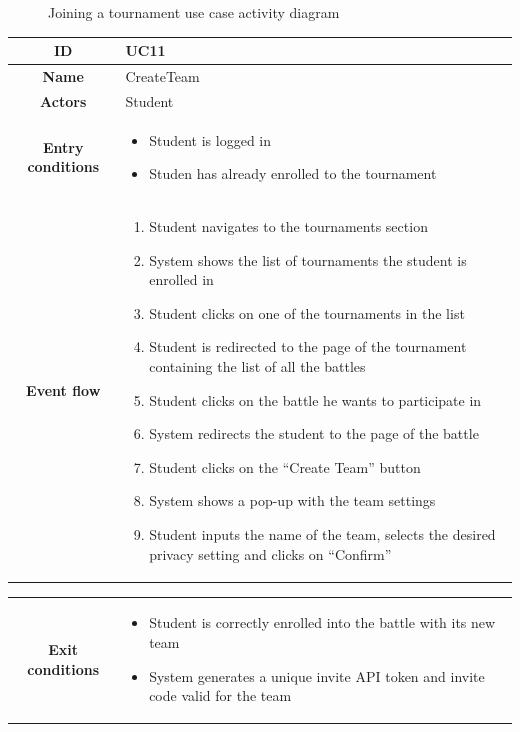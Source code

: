 \begin{center}
\begin{figure}[H]
        \caption{Joining a tournament use case activity diagram}
    \end{figure}
    \begin{tabular}{ |c|m{10cm}| }
        \hline
        \textbf{ID} & UC11 \\
        \hline
        \textbf{Name} & CreateTeam \\
        \hline
        \textbf{Actors} & Student \\
        \hline
        \textbf{Entry conditions} &
        \begin{itemize}
            \item Student is logged in
            \item Studen has already enrolled to the tournament
        \end{itemize} \\
        \hline
        \textbf{Event flow} &
        \begin{enumerate}
            \item Student navigates to the tournaments section
            \item System shows the list of tournaments the student is enrolled in
            \item Student clicks on one of the tournaments in the list
            \item Student is redirected to the page of the tournament containing the list of all the battles
            \item Student clicks on the battle he wants to participate in
            \item System redirects the student to the page of the battle
            \item Student clicks on the “Create Team” button
            \item System shows a pop-up with the team settings
            \item Student inputs the name of the team, selects the desired privacy setting and clicks on “Confirm”
        \end{enumerate} \\
        \hline
    \end{tabular}
    \newpage
    \begin{tabular}{ |c|m{10cm}| }
        \hline
        \textbf{Exit conditions} &
        \begin{itemize}
            \item Student is correctly enrolled into the battle with its new team
            \item System generates a unique invite API token and invite code valid for the team

\end{itemize}
\end{tabular}
\end{center}
